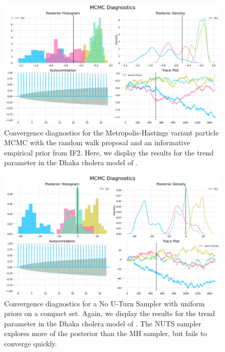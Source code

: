 
\begin{figure}[H]
    \centering
    \includegraphics[width=\textwidth/\real{1.25}]{imgs/pmcmc/mh.png}
    \caption{Convergence diagnostics for the Metropolis-Hastings variant particle MCMC with the random walk proposal and an informative empirical prior from IF2. Here, we display the results for the trend parameter in the Dhaka cholera model of \cite{king08}.}
    \label{fig:mh}
\end{figure}


\begin{figure}[H]
    \centering
    \includegraphics[width=\textwidth/\real{1.25}]{imgs/pmcmc/nuts.png}
    \caption{Convergence diagnostics for a No U-Turn Sampler with uniform priors on a compact set. Again, we display the results for the trend parameter in the Dhaka cholera model of \cite{king08}. The NUTS sampler explores more of the posterior than the MH sampler, but fails to converge quickly.}
    \label{fig:nuts}
\end{figure}


